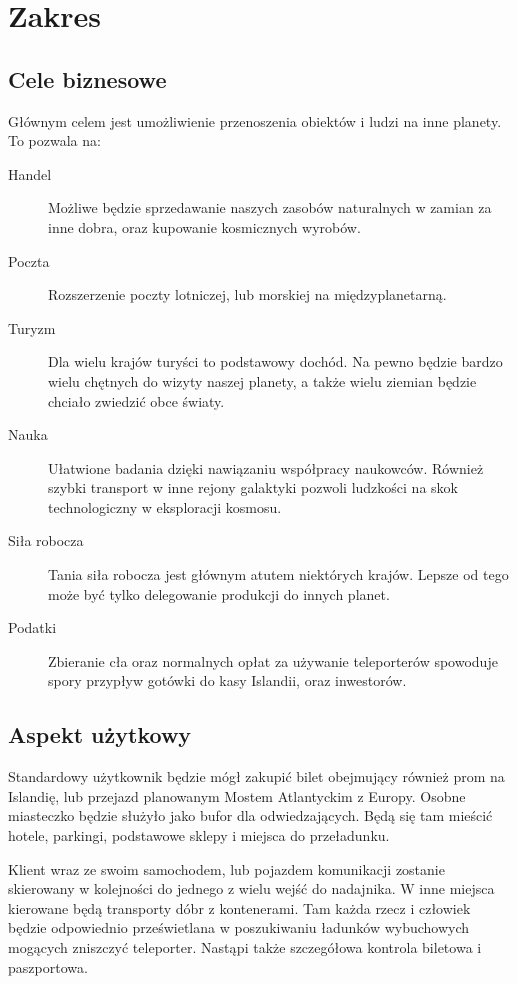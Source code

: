 \section{Zakres} 
\subsection{Cele biznesowe}
Głównym celem jest umożliwienie przenoszenia obiektów i ludzi na inne planety.
To pozwala na:
\begin{description}
\item[Handel] Możliwe będzie sprzedawanie naszych zasobów naturalnych w zamian za inne dobra, oraz kupowanie kosmicznych wyrobów.
\item[Poczta] Rozszerzenie poczty lotniczej, lub morskiej na międzyplanetarną.
\item[Turyzm] Dla wielu krajów turyści to podstawowy dochód. Na pewno będzie bardzo wielu chętnych do wizyty naszej planety, a także wielu ziemian będzie chciało zwiedzić obce światy.
\item[Nauka] Ułatwione badania dzięki nawiązaniu współpracy naukowców. Również szybki transport w inne rejony galaktyki pozwoli ludzkości na skok technologiczny w eksploracji kosmosu.
\item[Siła robocza] Tania siła robocza jest głównym atutem niektórych krajów. Lepsze od tego może być tylko delegowanie produkcji do innych planet.
\item[Podatki] Zbieranie cła oraz normalnych opłat za używanie teleporterów spowoduje spory przypływ gotówki do kasy Islandii, oraz inwestorów.
\end{description}

\subsection{Aspekt użytkowy}
Standardowy użytkownik będzie mógł zakupić bilet obejmujący również prom na Islandię, lub przejazd planowanym Mostem Atlantyckim z Europy.
Osobne miasteczko będzie służyło jako bufor dla odwiedzających.
Będą się tam mieścić hotele, parkingi, podstawowe sklepy i miejsca do przeładunku.

Klient wraz ze swoim samochodem, lub pojazdem komunikacji zostanie skierowany w kolejności do jednego z wielu wejść do nadajnika.
W inne miejsca kierowane będą transporty dóbr z kontenerami.
Tam każda rzecz i człowiek będzie odpowiednio prześwietlana w poszukiwaniu ładunków wybuchowych mogących zniszczyć teleporter.
Nastąpi także szczegółowa kontrola biletowa i paszportowa.

